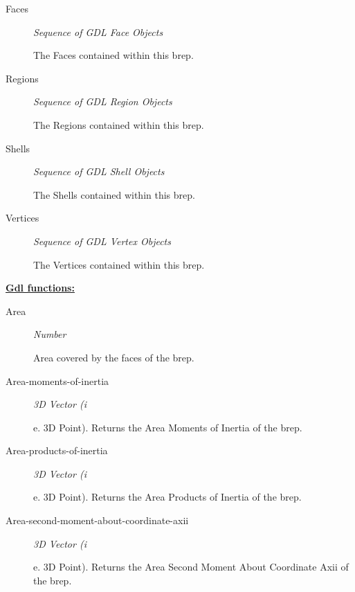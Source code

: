 \documentclass [11pt]{book}
\begin{document}
\begin{itemize}
\begin{description}
\item [Faces]
\emph{Sequence of GDL Face Objects}

 The Faces contained within this brep.




\item [Regions]
\emph{Sequence of GDL Region Objects}

 The Regions contained within this brep.




\item [Shells]
\emph{Sequence of GDL Shell Objects}

 The Shells contained within this brep.




\item [Vertices]
\emph{Sequence of GDL Vertex Objects}

 The Vertices contained within this brep.




\end{description}






\textbf{
\underline{Gdl functions:}}

\begin{description}

\item [Area]
\emph{Number}

 Area covered by the faces of the brep.




\item [Area-moments-of-inertia]
\emph{3D Vector (i}

e. 3D Point). Returns the Area Moments of Inertia of the brep.




\item [Area-products-of-inertia]
\emph{3D Vector (i}

e. 3D Point). Returns the Area Products of Inertia of the brep.




\item [Area-second-moment-about-coordinate-axii]
\emph{3D Vector (i}

e. 3D Point). Returns the Area Second Moment About Coordinate Axii of the brep.





\end{description}
\end{itemize}
\end{document}
